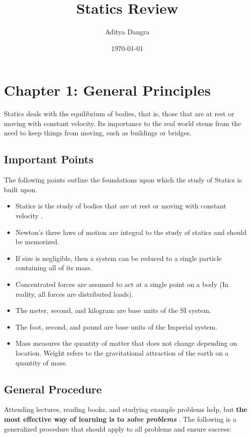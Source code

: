\documentclass[12pt]{article}
\begin{document}
\title{Statics Review}
\author{Aditya Dangra}
\date{\today}
\maketitle

\tableofcontents
\pagebreak
{}

\section{Chapter 1: General Principles}
Statics deals with the equilibrium of bodies, that is, those that are at rest or moving with constant velocity.
Its importance to the real world stems from the need to keep things from moving, such as buildings or bridges.

\subsection{Important Points}
The following points outline the foundations upon which the study of Statics is built upon.

\begin{itemize}
    \item Statics is the study of bodies that are at rest or moving with constant velocity \cite{hibbeler}.
    \item Newton's three laws of motion are integral to the study of statics and should be memorized.
    \item If size is negligible, then a system can be reduced to a single particle containing all of its mass.
    \item Concentrated forces are assumed to act at a single point on a body (In reality, all forces are distributed loads).
    \item The meter, second, and kilogram are base units of the SI system.
    \item The foot, second, and pound are base units of the Imperial system.
    \item Mass measures the quantity of matter that does not change depending on location. Weight refers to the gravitational attraction of the earth on a quantity of mass.
\end{itemize}

\subsection{General Procedure}
Attending lectures, reading books, and studying example problems help, but \textbf{the most effective way of learning is to \textit{solve problems}} \cite{hibbeler}.
The following is a generalized procedure that should apply to all problems and ensure success:
\end{document}
